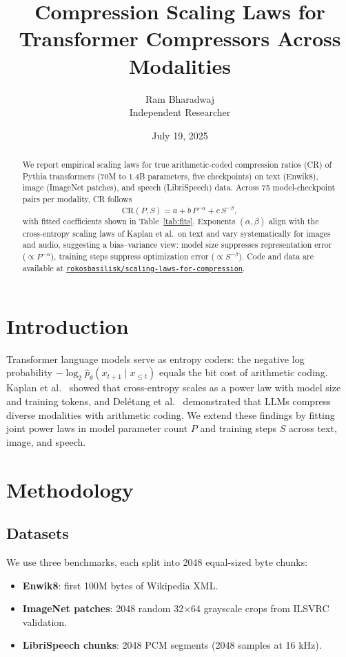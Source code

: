 \documentclass{article}
\title{Compression Scaling Laws for Transformer Compressors Across Modalities}
\author{Ram Bharadwaj\\Independent Researcher}
\date{July 19, 2025}
\begin{document}
\maketitle

\begin{abstract}
We report empirical scaling laws for true arithmetic-coded compression ratios (CR) of Pythia transformers (70M to 1.4B parameters, five checkpoints) on text (Enwik8), image (ImageNet patches), and speech (LibriSpeech) data. Across 75 model-checkpoint pairs per modality, CR follows
\[
  \mathrm{CR}(P,S) = a + b\,P^{-\alpha} + c\,S^{-\beta},
\]
with fitted coefficients shown in Table~\ref{tab:fits}. Exponents $(\alpha,\beta)$ align with the cross-entropy scaling laws of Kaplan et al.\ on text and vary systematically for images and audio, suggesting a bias–variance view: model size suppresses representation error ($\propto P^{-\alpha}$), training steps suppress optimization error ($\propto S^{-\beta}$). Code and data are available at \href{https://github.com/rokosbasilisk/scaling-laws-for-compression}{\texttt{rokosbasilisk/scaling-laws-for-compression}}.
\end{abstract}

\section{Introduction}
Transformer language models serve as entropy coders: the negative log probability $-\log_2\hat p_\theta(x_{t+1}\mid x_{\le t})$ equals the bit cost of arithmetic coding. Kaplan et al.~\cite{kaplan2020scaling} showed that cross-entropy scales as a power law with model size and training tokens, and Del\'etang et al.~\cite{deletang2023compression} demonstrated that LLMs compress diverse modalities with arithmetic coding. We extend these findings by fitting joint power laws in model parameter count $P$ and training steps $S$ across text, image, and speech.

\section{Methodology}
\subsection{Datasets}
We use three benchmarks, each split into 2048 equal-sized byte chunks:
\begin{itemize}\itemsep0pt
  \item \textbf{Enwik8}: first 100M bytes of Wikipedia XML.
  \item \textbf{ImageNet patches}: 2048 random 32$\times$64 grayscale crops from ILSVRC validation.
  \item \textbf{LibriSpeech chunks}: 2048 PCM segments (2048 samples at 16 kHz).
\end{itemize}
\end{document}
